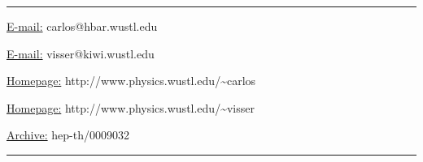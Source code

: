 \documentclass[a4paper,10pt]{article}
\begin{document}
\vfill
\hrule
\bigskip
\centerline{\underline{E-mail:} {\sf carlos@hbar.wustl.edu}}
\centerline{\underline{E-mail:} {\sf visser@kiwi.wustl.edu}}
\bigskip
\centerline{\underline{Homepage:} {\sf http://www.physics.wustl.edu/\~{}carlos}}
\centerline{\underline{Homepage:} {\sf http://www.physics.wustl.edu/\~{}visser}}
\bigskip
\centerline{\underline{Archive:}
{\sf hep-th/0009032}}
\bigskip
\hrule
\clearpage
\def\Box{\nabla^2}
\def\d{{\mathrm d}}
\def\ie{{\em i.e.\/}}
\def\eg{{\em e.g.\/}}
\def\etc{{\em etc.\/}}
\def\etal{{\em et al.\/}}
\def\S{{\mathcal S}}
\def\I{{\mathcal I}}
\def\L{{\mathcal L}}
\def\H{{\mathcal H}}
\def\M{{\mathcal M}}
\def\R{{\mathcal R}}
\def\K{{\mathcal K}}
\def\F{{\mathcal F}}
\def\E{{\mathcal E}}
\def\eff{{\mathrm{eff}}}
\def\Newton{{\mathrm{Newton}}}
\def\Einstein{{\mathrm{Einstein}}}
\def\bulk{{\mathrm{bulk}}}
\def\brane{{\mathrm{brane}}}
\def\matter{{\mathrm{matter}}}
\def\tr{{\mathrm{tr}}}
\def\normal{{\mathrm{normal}}}
\def\implies{\Rightarrow}
\def\half{{1\over2}}
\def\effective{{\mathrm{effective}}}
\def\anomalous{{\mathrm{anomalous}}}
\def\quadratic{{\mathrm{quadratic}}}
\def\Eotvos{{E\"otv\"os}}
\def\HRULE{\bigskip\hrule\bigskip}


\end{document}
